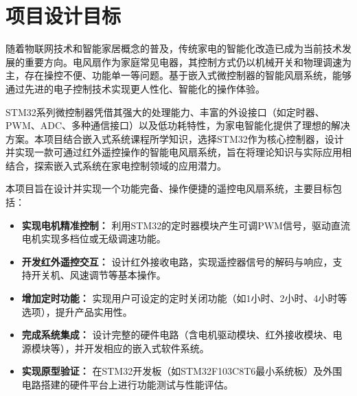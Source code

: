 
\section{项目设计目标}

随着物联网技术和智能家居概念的普及，传统家电的智能化改造已成为当前技术发展的重要方向。电风扇作为家庭常见电器，其控制方式仍以机械开关和物理调速为主，存在操控不便、功能单一等问题。基于嵌入式微控制器的智能风扇系统，能够通过先进的电子控制技术实现更人性化、智能化的操作体验。

STM32系列微控制器凭借其强大的处理能力、丰富的外设接口（如定时器、PWM、ADC、多种通信接口）以及低功耗特性，为家电智能化提供了理想的解决方案。本项目结合嵌入式系统课程所学知识，选择STM32作为核心控制器，设计并实现一款可通过红外遥控操作的智能电风扇系统，旨在将理论知识与实际应用相结合，探索嵌入式系统在家电控制领域的应用潜力。

本项目旨在设计并实现一个功能完备、操作便捷的遥控电风扇系统，主要目标包括：
\begin{itemize}
    \item \textbf{实现电机精准控制：} 利用STM32的定时器模块产生可调PWM信号，驱动直流电机实现多档位或无级调速功能。
    \item \textbf{开发红外遥控交互：} 设计红外接收电路，实现遥控器信号的解码与响应，支持开关机、风速调节等基本操作。
    \item \textbf{增加定时功能：} 实现用户可设定的定时关闭功能（如1小时、2小时、4小时等选项），提升产品实用性。
    \item \textbf{完成系统集成：} 设计完整的硬件电路（含电机驱动模块、红外接收模块、电源模块等），并开发相应的嵌入式软件系统。
    \item \textbf{实现原型验证：} 在STM32开发板（如STM32F103C8T6最小系统板）及外围电路搭建的硬件平台上进行功能测试与性能评估。
\end{itemize}
